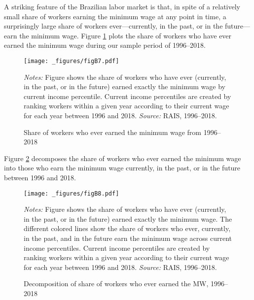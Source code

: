 A striking feature of the Brazilian labor market is that, in spite of a relatively small share of workers earning the minimum wage at any point in time, a surprisingly large share of workers ever---currently, in the past, or in the future---earn the minimum wage. Figure \ref{fig:MW_share_ever} plots the share of workers who have ever earned the minimum wage during our sample period of 1996--2018.


\begin{figure}[!htb]
  \centering
  \caption{\label{fig:MW_share_ever}Share of workers who ever earned the minimum wage from 1996--2018}
  \prefigvspace
  \texttt{[image: \_figures/figB7.pdf]}%
  \\
  \postfigvspace
  \begin{minipage}[t]{1\columnwidth}%
    \begin{spacing}{0.75}
      \emph{\scriptsize{}Notes: }{\scriptsize{}Figure shows the share of workers who have ever (currently, in the past, or in the future) earned exactly the minimum wage by current income percentile. Current income percentiles are created by ranking workers within a given year according to their current wage for each year between 1996 and 2018. %
      \emph{\scriptsize{}Source: } RAIS, 1996--2018.}
    \end{spacing}
  \end{minipage}
\end{figure}


Figure \ref{fig: MW_share_ever_decomp} decomposes the share of workers who ever earned the minimum wage into those who earn the minimum wage currently, in the past, or in the future between 1996 and 2018.


\begin{figure}[!htb]
  \centering
  \caption{\label{fig: MW_share_ever_decomp}Decomposition of share of workers who ever earned the MW, 1996--2018}
  \prefigvspace
  \texttt{[image: \_figures/figB8.pdf]} %
  \\
  \postfigvspace
  \begin{minipage}[t]{1\columnwidth}%
    \begin{spacing}{0.75}
      \emph{\scriptsize{}Notes: }{\scriptsize{}Figure shows the share of workers who have ever (currently, in the past, or in the future) earned exactly the minimum wage. The different colored lines show the share of workers who ever, currently, in the past, and in the future earn the minimum wage across current income percentiles. Current income percentiles are created by ranking workers within a given year according to their current wage for each year between 1996 and 2018. %
      \emph{\scriptsize{}Source: } RAIS, 1996--2018.}
    \end{spacing}
  \end{minipage}
\end{figure}


